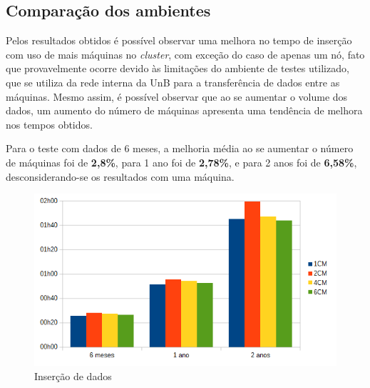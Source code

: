 \subsection{Comparação dos ambientes}

Pelos resultados obtidos é possível observar uma melhora no tempo de inserção com uso de mais máquinas no \emph{cluster}, com exceção do caso de apenas um nó, fato que provavelmente ocorre devido às limitações do ambiente de testes utilizado, que se utiliza da rede interna da UnB para a transferência de dados entre as máquinas. Mesmo assim, é possível observar que ao se aumentar o volume dos dados, um aumento do número de máquinas apresenta uma tendência de melhora nos tempos obtidos.

Para o teste com dados de 6 meses, a melhoria média ao se aumentar o número de máquinas foi de \textbf{2,8\%}, para 1 ano foi de \textbf{2,78\%}, e para 2 anos foi de \textbf{6,58\%}, desconsiderando-se os resultados com uma máquina.

\begin{figure}[!htb]
	\centering
	\includegraphics[width=1\textwidth]{figuras/graphinsert.png}
	\caption{Inserção de dados}
	\label{fig:graphinsert}
\end{figure}

